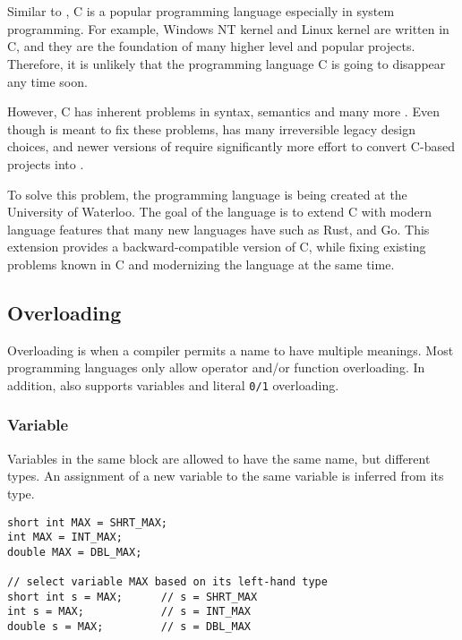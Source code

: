 \chapter{\CFA} \label{CFA}
Similar to \CC, C is a popular programming language especially in system
programming. For example, Windows NT kernel and Linux kernel are written in C, and they are the foundation of many higher level
and popular projects. Therefore, it is unlikely that the programming language C is
going to disappear any time soon.

However, C has inherent problems in syntax, semantics and many
more \cite{reference2}. Even though \CCS is meant to fix these problems, \CCS has many
irreversible legacy design choices, and newer versions of \CCS require significantly more effort to convert C-based projects into \CCS.

To solve this problem, the programming language \CFAS is being created at the University of Waterloo. The goal
of the language is to extend C with modern language features that many new
languages have such as Rust, and Go. This extension provides a
backward-compatible version of C, while fixing existing problems known in C and
modernizing the language at the same time.

\section{Overloading}
Overloading is when a compiler permits a name to have multiple meanings. Most programming languages only allow operator and/or function overloading.
In addition, \CFAS also supports variables and literal
\verb|0/1| overloading.

\subsection{Variable}
Variables in the same block are allowed to have the same name, but different
types. An assignment of a new variable to the same variable is inferred from its type.


\begin{lstlisting}[caption={Overloading variables in \CFA}, label={CFA-overload-var}]
short int MAX = SHRT_MAX;
int MAX = INT_MAX;
double MAX = DBL_MAX;

// select variable MAX based on its left-hand type
short int s = MAX;      // s = SHRT_MAX
int s = MAX;            // s = INT_MAX
double s = MAX;         // s = DBL_MAX
\end{lstlisting}

